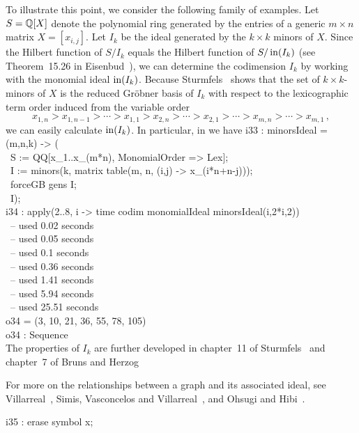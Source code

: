 To illustrate this point, we consider the following family of
examples.  Let $S = {\mathbb Q}[X]$ denote the polynomial ring generated by
the entries of a generic $m \times n$ matrix $X = [x_{i,j}]$.  Let
$I_{k}$ be the ideal generated by the $k \times
k$ minors of $X$.  Since the Hilbert function of $S / I_{k}$ equals
the Hilbert function of $S / \operatorname{in}(I_{k})$ (see Theorem~15.26 in
Eisenbud~\cite{MR97a:13001}), we can determine the codimension $I_{k}$
by working with the monomial ideal $\operatorname{in}(I_{k})$.  Because
Sturmfels~\cite{MR91m:14076} shows that the set of $k \times k$-minors
of $X$ is the reduced Gr\"{o}bner basis of $I_{k}$ with respect to the
lexicographic term order induced from the variable order
\[
x_{1,n} > x_{1,n-1} > \dotsb > x_{1,1} > x_{2,n} > \dotsb > x_{2,1} >
\dotsb > x_{m,n} > \dotsb > x_{m,1} \, ,
\] 
we can easily calculate $\operatorname{in}(I_k)$.  In particular, in \Mtwo we
have
\beginOutput
i33 : minorsIdeal = (m,n,k) -> (\\
\           S := QQ[x_1..x_(m*n), MonomialOrder => Lex];\\
\           I := minors(k, matrix table(m, n, (i,j) -> x_(i*n+n-j)));\\
\           forceGB gens I;\\
\           I);\\
\endOutput
\beginOutput
i34 : apply(2..8, i -> time codim monomialIdeal minorsIdeal(i,2*i,2))\\
\     -- used 0.02 seconds\\
\     -- used 0.05 seconds\\
\     -- used 0.1 seconds\\
\     -- used 0.36 seconds\\
\     -- used 1.41 seconds\\
\     -- used 5.94 seconds\\
\     -- used 25.51 seconds\\
\emptyLine
o34 = (3, 10, 21, 36, 55, 78, 105)\\
\emptyLine
o34 : Sequence\\
\endOutput
The properties of $I_{k}$ are further developed in chapter~11 of
Sturmfels~\cite{MR97b:13034} and chapter~7 of Bruns and
Herzog~\cite{MR95h:13020}

For more on the relationships between a graph and its associated
ideal, see Villarreal~\cite{MR91b:13031}, Simis, Vasconcelos and
Villarreal~\cite{MR99c:13004}, and Ohsugi and
Hibi~\cite{MR2000a:13010}.

\beginOutput
i35 : erase symbol x;\\
\endOutput

